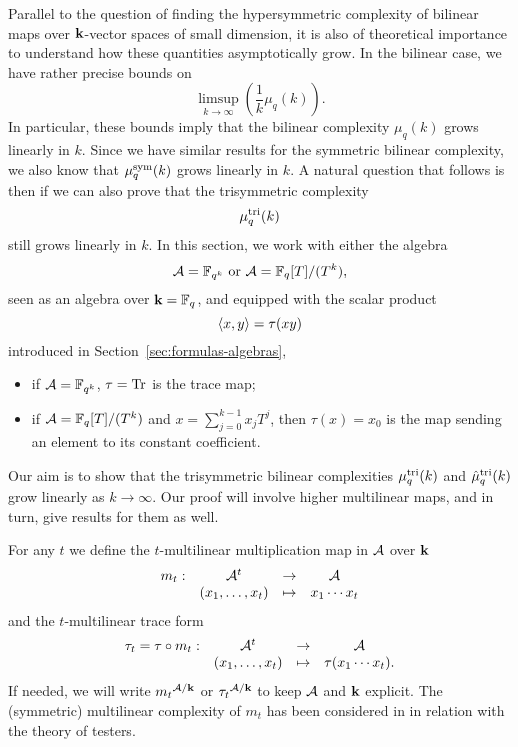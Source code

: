Parallel to the question of finding the hypersymmetric complexity of bilinear
maps over $\mathbf{k}$-vector spaces of small dimension, it is also of theoretical
importance to understand how these quantities asymptotically grow. In the
bilinear case, we have rather precise bounds on
\[
  \limsup_{k\to\infty}(\frac{1}{k}\mu_q(k)).
\]
In particular, these bounds imply that the bilinear complexity $\mu_q(k)$ grows
linearly in $k$. Since we have similar results for the symmetric bilinear
complexity, we also know that $\mu^{\textrm{sym}}_q(k)$ grows linearly in $k$. A natural
question that follows is then if we can also prove that the trisymmetric
complexity
\[
  \mu^{\textrm{tri}}_q(k)
\]
still grows linearly in $k$. In this section, we work with either the algebra 
\[
  \mathcal{A}=\mathbb{F}_{q^k}\text{ or }\mathcal{A}=\mathbb{F}_q[T]/(T^k),
\]
seen as an algebra over $\mathbf{k}=\mathbb{F}_q$, and
equipped with the scalar product 
\[
  \left\langle x,y\right\rangle = \tau(xy)
\]
introduced in
Section~\ref{sec:formulas-algebras}, \ie
\begin{itemize}
  \item if $\mathcal{A}=\mathbb{F}_{q^k}$, $\tau=\operatorname{Tr}$ is the trace map;
  \item if $\mathcal{A} = \mathbb{F}_{q}[T]/(T^k)$ and $x=\sum_{j=0}^{k-1}x_jT^j$, then
    $\tau(x) = x_0$ is the map sending an element to its constant coefficient.
\end{itemize}
Our aim is to show that the trisymmetric bilinear complexities $\mu^{\textrm{tri}}_q(k)$ and $\hat\mu^{\textrm{tri}}_q(k)$ grow linearly as $k\to\infty$.
Our proof will involve higher multilinear maps, and in turn, give results for them as well.

For any $t$ we define the $t$-multilinear multiplication map in $\mathcal{A}$ over $\mathbf{k}$
\[
\begin{array}{cccc}
m_t:&\mathcal{A}^t&\to&\mathcal{A}\\
&(x_1,\dots,x_t)&\mapsto&x_1\cdots x_t
\end{array}
\]
and the $t$-multilinear trace form
\[
\begin{array}{cccc}
\tau_t=\tau\circ m_t:&\mathcal{A}^t&\to&\mathcal{A}\\
&(x_1,\dots,x_t)&\mapsto&\tau(x_1\cdots x_t).
\end{array}
\]
If needed, we will write ${m_t}^{\mathcal{A}/\mathbf{k}}$ or ${\tau_t}^{\mathcal{A}/\mathbf{k}}$ to keep $\mathcal{A}$ and $\mathbf{k}$ explicit. 
The (symmetric) multilinear complexity of $m_t$ has been considered in \cite{Bshouty13} in relation with the theory of testers.

